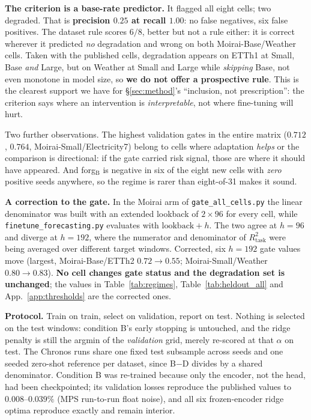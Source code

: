 \documentclass{article}
\begin{document}


\noindent \textbf{The criterion is a base-rate predictor.} It flagged all eight cells; two
degraded. That is \textbf{precision $0.25$ at recall $1.00$}: no false negatives, six false
positives. The dataset rule scores $6/8$, better but not a rule either: it is correct wherever it
predicted \emph{no} degradation and wrong on both Moirai-Base/Weather cells. Taken with the
published cells, degradation appears on ETTh1 at Small, Base \emph{and} Large, but on Weather at
Small and Large while \emph{skipping} Base, not even monotone in model size, so \textbf{we do not
offer a prospective rule}. This is the clearest support we have for \S\ref{sec:method}'s ``inclusion, not prescription'':
the criterion says where an intervention is \emph{interpretable}, not where fine-tuning will hurt.

\noindent Two further observations. The highest validation gates in the entire matrix
($0.712$, $0.764$, Moirai-Small/Electricity7) belong to cells where adaptation \emph{helps} or the
comparison is directional: if the gate carried risk signal, those are where it should have
appeared. And forg$_\text{B}$ is negative in six of the eight new cells with \emph{zero} positive
seeds anywhere, so the regime is rarer than eight-of-31 makes it sound.

\textbf{A correction to the gate.} In the Moirai arm of \texttt{gate\_all\_cells.py} the linear
denominator was built with an extended lookback of $2\times96$ for every cell, while \texttt{finetune\_forecasting.py} evaluates with
$\text{lookback}+h$. The two agree at $h{=}96$ and diverge at $h{=}192$, where the numerator and
denominator of $R^2_\text{task}$ were being averaged over different target windows. Corrected, six
$h{=}192$ gate values move (largest, Moirai-Base/ETTh2 $0.72 \to 0.55$; Moirai-Small/Weather
$0.80 \to 0.83$). \textbf{No cell changes gate status and the degradation set is unchanged}; the
values in Table~\ref{tab:regimes}, Table~\ref{tab:heldout_all} and App.~\ref{app:thresholds} are
the corrected ones.

\textbf{Protocol.} Train on train, select on validation, report on test. Nothing is selected on the
test windows: condition B's early stopping is untouched, and the ridge penalty is still the
argmin of the \emph{validation} grid, merely re-scored at that $\alpha$ on test. The Chronos runs
share one fixed test subsample across seeds and one seeded zero-shot reference per dataset, since
B$-$D divides by a shared denominator. Condition B was re-trained because only the encoder, not the
head, had been checkpointed; its validation losses reproduce the published values to
$0.008$--$0.039\%$ (MPS run-to-run float noise), and all six frozen-encoder ridge optima reproduce
exactly and remain interior.
\end{document}
